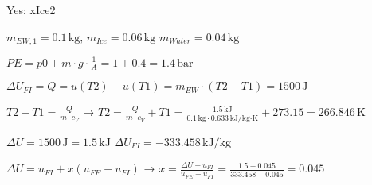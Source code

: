 Yes: xIce2  

\( m_{EW,1} = 0.1 \, \text{kg}, \, m_{Ice} = 0.06 \, \text{kg} \)  
\( m_{Water} = 0.04 \, \text{kg} \)  

\( PE = p0 + m \cdot g \cdot \frac{1}{A} = 1 + 0.4 = 1.4 \, \text{bar} \)  

\( \Delta U_{FI} = Q = u(T2) - u(T1) = m_{EW} \cdot (T2 - T1) = 1500 \, \text{J} \)  

\( T2 - T1 = \frac{Q}{m \cdot c_V} \) → \( T2 = \frac{Q}{m \cdot c_V} + T1 = \frac{1.5 \, \text{kJ}}{0.1 \, \text{kg} \cdot 0.633 \, \text{kJ/kg·K}} + 273.15 = 266.846 \, \text{K} \)  

\( \Delta U = 1500 \, \text{J} = 1.5 \, \text{kJ} \)  
\( \Delta U_{FI} = -333.458 \, \text{kJ/kg} \)  

\( \Delta U = u_{FI} + x(u_{FE} - u_{FI}) \) → \( x = \frac{\Delta U - u_{FI}}{u_{FE} - u_{FI}} = \frac{1.5 - 0.045}{333.458 - 0.045} = 0.045 \)